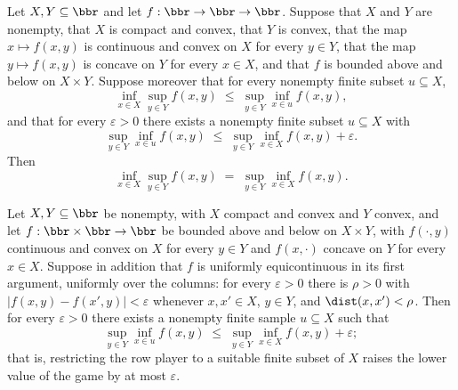 \begin{theorem}
\label{OnlineLearning.convex_compact_minimax_of_theorem71_route}
\leanok
{}
Let $X, Y \subseteq \bbr$ and let $f : \bbr \to \bbr \to \bbr$. Suppose that $X$ and $Y$
are nonempty, that $X$ is compact and convex, that $Y$ is convex, that the map $x
\mapsto f(x,y)$ is continuous and convex on $X$ for every $y \in Y$, that the map $y
\mapsto f(x,y)$ is concave on $Y$ for every $x \in X$, and that $f$ is bounded above and
below on $X \times Y$. Suppose moreover that for every nonempty finite subset $u
\subseteq X$,
\[
  \inf_{x \in X} \sup_{y \in Y} f(x,y) \;\le\; \sup_{y \in Y} \inf_{x \in u} f(x,y),
\]
and that for every $\varepsilon > 0$ there exists a nonempty finite subset $u \subseteq
X$ with
\[
\sup_{y \in Y} \inf_{x \in u} f(x,y) \;\le\; \sup_{y \in Y} \inf_{x \in X} f(x,y) +
\varepsilon.
\]
Then
\[
  \inf_{x \in X} \sup_{y \in Y} f(x,y) \;=\; \sup_{y \in Y} \inf_{x \in X} f(x,y).
\]
\end{theorem}

\begin{theorem}
\label{OnlineLearning.theorem71_compactApproximation_of_uniformEquicontinuity}
\leanok
{}
Let $X, Y \subseteq \bbr$ be nonempty, with $X$ compact and convex and $Y$ convex, and
let $f : \bbr \times \bbr \to \bbr$ be bounded above and below on $X \times Y$, with
$f(\cdot, y)$ continuous and convex on $X$ for every $y \in Y$ and $f(x, \cdot)$ concave
on $Y$ for every $x \in X$. Suppose in addition that $f$ is uniformly equicontinuous in
its first argument, uniformly over the columns: for every $\varepsilon > 0$ there is
$\rho > 0$ with $|f(x,y) - f(x',y)| < \varepsilon$ whenever $x, x' \in X$, $y \in Y$,
and $\dist(x, x') < \rho$. Then for every $\varepsilon > 0$ there exists a nonempty
finite sample $u \subseteq X$ such that
\[
  \sup_{y \in Y} \inf_{x \in u} f(x, y)
    \;\le\;
  \sup_{y \in Y} \inf_{x \in X} f(x, y) + \varepsilon;
\]
that is, restricting the row player to a suitable finite subset of $X$ raises the lower
value of the game by at most $\varepsilon$.
\end{theorem}

